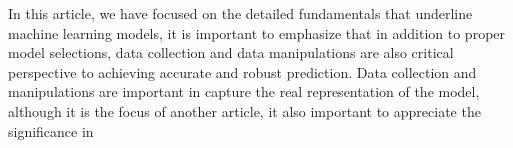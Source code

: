 
\par
In this article, we have focused on the detailed fundamentals that underline machine learning models, it is important to emphasize that in addition to proper model selections, data collection and data manipulations are also critical perspective to achieving accurate and robust prediction. Data collection and manipulations are important in capture the real representation of the model, although it is the focus of another article, it also important to appreciate the significance in 
\par 
